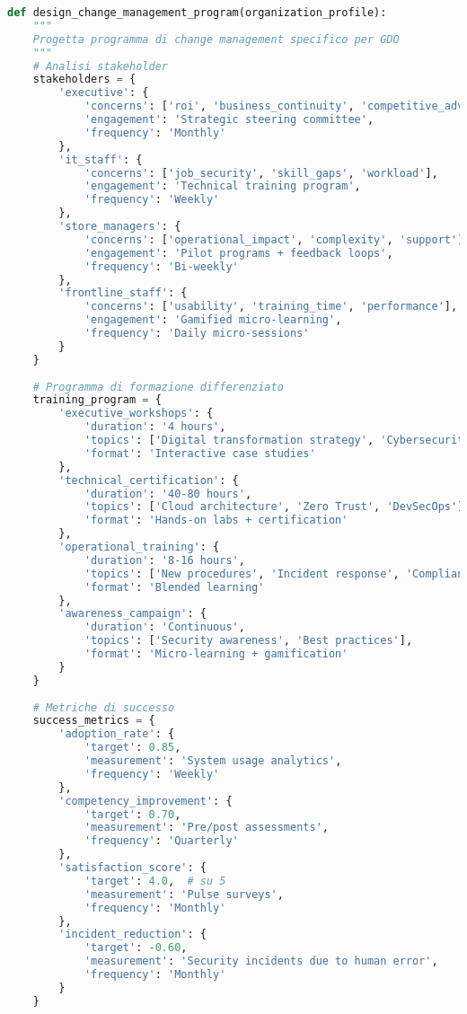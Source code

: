 \begin{lstlisting}[language=Python, caption=Programma change management GDO]
def design_change_management_program(organization_profile):
    """
    Progetta programma di change management specifico per GDO
    """
    # Analisi stakeholder
    stakeholders = {
        'executive': {
            'concerns': ['roi', 'business_continuity', 'competitive_advantage'],
            'engagement': 'Strategic steering committee',
            'frequency': 'Monthly'
        },
        'it_staff': {
            'concerns': ['job_security', 'skill_gaps', 'workload'],
            'engagement': 'Technical training program',
            'frequency': 'Weekly'
        },
        'store_managers': {
            'concerns': ['operational_impact', 'complexity', 'support'],
            'engagement': 'Pilot programs + feedback loops',
            'frequency': 'Bi-weekly'
        },
        'frontline_staff': {
            'concerns': ['usability', 'training_time', 'performance'],
            'engagement': 'Gamified micro-learning',
            'frequency': 'Daily micro-sessions'
        }
    }
    
    # Programma di formazione differenziato
    training_program = {
        'executive_workshops': {
            'duration': '4 hours',
            'topics': ['Digital transformation strategy', 'Cybersecurity governance'],
            'format': 'Interactive case studies'
        },
        'technical_certification': {
            'duration': '40-80 hours',
            'topics': ['Cloud architecture', 'Zero Trust', 'DevSecOps'],
            'format': 'Hands-on labs + certification'
        },
        'operational_training': {
            'duration': '8-16 hours',
            'topics': ['New procedures', 'Incident response', 'Compliance basics'],
            'format': 'Blended learning'
        },
        'awareness_campaign': {
            'duration': 'Continuous',
            'topics': ['Security awareness', 'Best practices'],
            'format': 'Micro-learning + gamification'
        }
    }
    
    # Metriche di successo
    success_metrics = {
        'adoption_rate': {
            'target': 0.85,
            'measurement': 'System usage analytics',
            'frequency': 'Weekly'
        },
        'competency_improvement': {
            'target': 0.70,
            'measurement': 'Pre/post assessments',
            'frequency': 'Quarterly'
        },
        'satisfaction_score': {
            'target': 4.0,  # su 5
            'measurement': 'Pulse surveys',
            'frequency': 'Monthly'
        },
        'incident_reduction': {
            'target': -0.60,
            'measurement': 'Security incidents due to human error',
            'frequency': 'Monthly'
        }
    }
    

\end{lstlisting}
